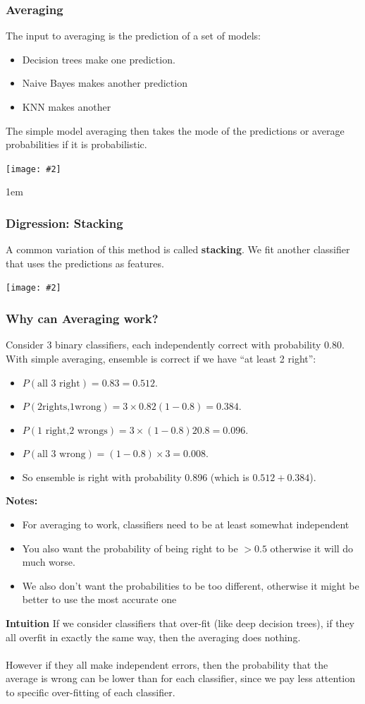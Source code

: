 \documentclass{article}
\def\blu#1{{\color{blu}#1}}
\def\gre#1{{\color{gre}#1}}
\theoremstyle{definition}
\newcommand{\centerfig}[2]{\begin{center}\texttt{[image: \#2]}\end{center}}
\begin{document}
\subsubsection*{Averaging}
The input to \blu{averaging} is the prediction of a set of models:
\begin{itemize}
	\item Decision trees make one prediction. 
	\item Naive Bayes makes another prediction
	\item KNN makes another
\end{itemize}
The simple model averaging then takes the \gre{mode of the predictions} or average probabilities if it is probabilistic. 
\centerfig{0.85}{Pic11}

\begingroup
\leftskip1em
\subsubsection*{Digression: Stacking}
A common variation of this method is called \textbf{stacking}. We \gre{fit another classifier} that uses the predictions as features.
\centerfig{0.90}{Pic12}
\endgroup

\subsubsection*{Why can Averaging work?}
Consider 3 binary classifiers, \gre{each independently correct} with probability 0.80. With simple averaging, ensemble is correct if we have “at least 2 right”:
\begin{itemize}
	\item  $ P(\text{all 3 right}) = 0.83 = 0.512 $.
	\item $ P(\text{2rights,1wrong})=3\times0.82(1-0.8)=0.384. $
	\item$  P(\text{1 right,2 wrongs})=3 \times (1-0.8)20.8=0.096. $
	\item $ P(\text{all 3 wrong}) = (1-0.8)\times 3 = 0.008. $
	\item So ensemble is right with probability 0.896 (which is $ 0.512+0.384 $).
\end{itemize}
\textbf{Notes:}
\begin{itemize}
	\item For averaging to work, \gre{classifiers need to be at least somewhat independent}
	\item You also want the probability of being right to be $ > 0.5 $ otherwise it will do much worse. 
	\item We also don't want the probabilities to be too different, otherwise it might be better to use the most accurate one
\end{itemize}
\textbf{Intuition}
If we consider classifiers that over-fit (like deep decision trees), if they all overfit in exactly the same way, then the averaging does nothing. \\ \\
However if they all make \blu{independent errors}, then the probability that the average is wrong can be lower than for each classifier, since we pay less attention to specific over-fitting of each classifier.
\end{document}
